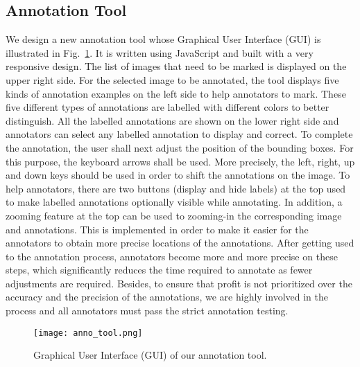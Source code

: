 \documentclass[journal]{IEEEtran}
\begin{document}
\subsection{Annotation Tool}
We design a new annotation tool whose Graphical User Interface (GUI) is illustrated in Fig.~\ref{fig:anno_tool}. It is written using JavaScript and built with a very responsive design. The list of images that need to be marked is displayed on the upper right side. For the selected image to be annotated, the tool displays five kinds of annotation examples on the left side to help annotators to mark. These five different types of annotations are labelled with different colors to better distinguish. All the labelled annotations are shown on the lower right side and annotators can select any labelled annotation to display and correct. To complete the annotation, the user shall next adjust the position of the bounding boxes. For this purpose, the keyboard arrows shall be used. More precisely, the left, right, up and down keys should be used in order to shift the annotations on the image. To help annotators, there are two buttons (display and hide labels) at the top used to make labelled annotations optionally visible while annotating. In addition, a zooming feature at the top can be used to zooming-in the corresponding image and annotations. This is implemented in order to make it easier for the annotators to obtain more precise locations of the annotations. After getting used to the annotation process, annotators become more and more precise on these steps, which significantly reduces the time required to annotate as fewer adjustments are required. Besides, to ensure that profit is not prioritized over the accuracy and the precision of the annotations, we are highly involved in the process and all annotators must pass the strict annotation testing.

\begin{figure}[t]
\begin{centering}
\texttt{[image: anno\_tool.png]}
\par\end{centering}
\caption{Graphical User Interface (GUI) of our annotation tool.}
\label{fig:anno_tool}
\end{figure}
\end{document}

